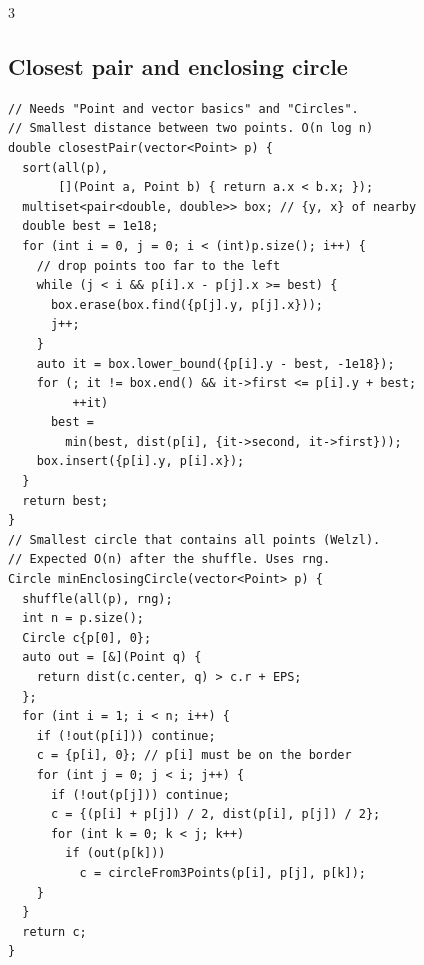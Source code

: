 \documentclass[8pt, a4paper]{article}
\begin{document}
\begin{multicols*}{3}
\subsection{Closest pair and enclosing circle}
\begin{lstlisting}
// Needs "Point and vector basics" and "Circles".
// Smallest distance between two points. O(n log n)
double closestPair(vector<Point> p) {
  sort(all(p),
       [](Point a, Point b) { return a.x < b.x; });
  multiset<pair<double, double>> box; // {y, x} of nearby
  double best = 1e18;
  for (int i = 0, j = 0; i < (int)p.size(); i++) {
    // drop points too far to the left
    while (j < i && p[i].x - p[j].x >= best) {
      box.erase(box.find({p[j].y, p[j].x}));
      j++;
    }
    auto it = box.lower_bound({p[i].y - best, -1e18});
    for (; it != box.end() && it->first <= p[i].y + best;
         ++it)
      best =
        min(best, dist(p[i], {it->second, it->first}));
    box.insert({p[i].y, p[i].x});
  }
  return best;
}
// Smallest circle that contains all points (Welzl).
// Expected O(n) after the shuffle. Uses rng.
Circle minEnclosingCircle(vector<Point> p) {
  shuffle(all(p), rng);
  int n = p.size();
  Circle c{p[0], 0};
  auto out = [&](Point q) {
    return dist(c.center, q) > c.r + EPS;
  };
  for (int i = 1; i < n; i++) {
    if (!out(p[i])) continue;
    c = {p[i], 0}; // p[i] must be on the border
    for (int j = 0; j < i; j++) {
      if (!out(p[j])) continue;
      c = {(p[i] + p[j]) / 2, dist(p[i], p[j]) / 2};
      for (int k = 0; k < j; k++)
        if (out(p[k]))
          c = circleFrom3Points(p[i], p[j], p[k]);
    }
  }
  return c;
}
\end{lstlisting}
\end{multicols*}
\end{document}
